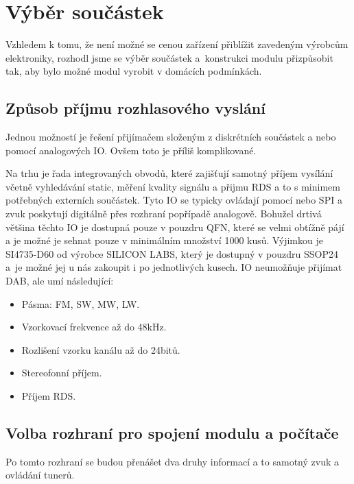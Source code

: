 \section{Výběr součástek}
\label{sec:Vyber}
Vzhledem k tomu, že není možné se cenou zařízení přiblížit zavedeným výrobcům elektroniky, rozhodl jsme se výběr součástek a~konstrukci modulu přizpůsobit tak, aby bylo možné modul vyrobit v domácích podmínkách.

 
\subsection{Způsob příjmu rozhlasového vyslání}
Jednou možností je řešení přijímačem složeným z diskrétních součástek a nebo pomocí analogových IO. Ovšem toto je příliš komplikované.

Na trhu je řada integrovaných obvodů, které zajišťují samotný příjem vysílání včetně vyhledávání static, měření kvality signálu a přijmu RDS a to s minimem potřebných externích součástek. Tyto IO se typicky ovládají pomocí \iic nebo SPI a zvuk poskytují digitálně přes rozhraní \iis popřípadě analogově. Bohužel drtivá většina těchto IO je dostupná pouze v pouzdru QFN, které se velmi obtížně pájí a je možné je sehnat pouze v minimálním množství 1000 kusů. Výjimkou je SI4735-D60 od výrobce SILICON LABS, který je dostupný v pouzdru SSOP24 a~je možné jej u nás zakoupit i po jednotlivých kusech. IO neumožňuje přijímat DAB, ale umí následující:
\begin{itemize}
\item{Pásma: FM, SW, MW, LW.}
\item{Vzorkovací frekvence až do 48kHz.}
\item{Rozlišení vzorku kanálu až do 24bitů.}
\item{Stereofonní příjem.}
\item{Příjem RDS.}
\end{itemize}

\subsection{Volba rozhraní pro spojení modulu a počítače}
Po tomto rozhraní se budou přenášet dva druhy informací a to samotný zvuk a ovládání tunerů.

